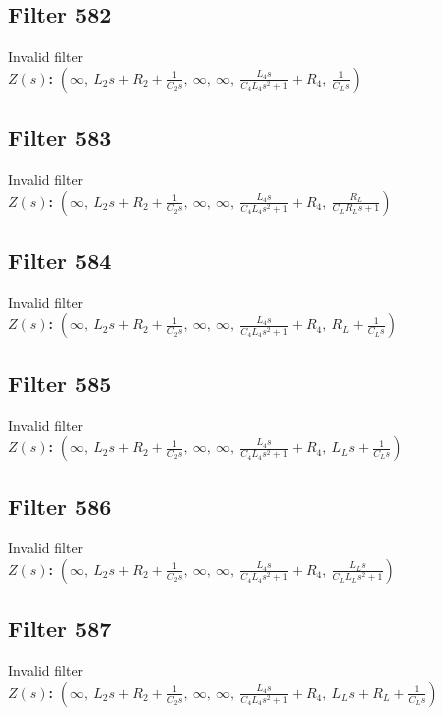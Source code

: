 \documentclass{article}
\begin{document}
\subsection*{Filter 582}
Invalid filter \\ 
\textbf{$Z(s)$:} $\left( \infty, \  L_{2} s + R_{2} + \frac{1}{C_{2} s}, \  \infty, \  \infty, \  \frac{L_{4} s}{C_{4} L_{4} s^{2} + 1} + R_{4}, \  \frac{1}{C_{L} s}\right)$ \\ 
\subsection*{Filter 583}
Invalid filter \\ 
\textbf{$Z(s)$:} $\left( \infty, \  L_{2} s + R_{2} + \frac{1}{C_{2} s}, \  \infty, \  \infty, \  \frac{L_{4} s}{C_{4} L_{4} s^{2} + 1} + R_{4}, \  \frac{R_{L}}{C_{L} R_{L} s + 1}\right)$ \\ 
\subsection*{Filter 584}
Invalid filter \\ 
\textbf{$Z(s)$:} $\left( \infty, \  L_{2} s + R_{2} + \frac{1}{C_{2} s}, \  \infty, \  \infty, \  \frac{L_{4} s}{C_{4} L_{4} s^{2} + 1} + R_{4}, \  R_{L} + \frac{1}{C_{L} s}\right)$ \\ 
\subsection*{Filter 585}
Invalid filter \\ 
\textbf{$Z(s)$:} $\left( \infty, \  L_{2} s + R_{2} + \frac{1}{C_{2} s}, \  \infty, \  \infty, \  \frac{L_{4} s}{C_{4} L_{4} s^{2} + 1} + R_{4}, \  L_{L} s + \frac{1}{C_{L} s}\right)$ \\ 
\subsection*{Filter 586}
Invalid filter \\ 
\textbf{$Z(s)$:} $\left( \infty, \  L_{2} s + R_{2} + \frac{1}{C_{2} s}, \  \infty, \  \infty, \  \frac{L_{4} s}{C_{4} L_{4} s^{2} + 1} + R_{4}, \  \frac{L_{L} s}{C_{L} L_{L} s^{2} + 1}\right)$ \\ 
\subsection*{Filter 587}
Invalid filter \\ 
\textbf{$Z(s)$:} $\left( \infty, \  L_{2} s + R_{2} + \frac{1}{C_{2} s}, \  \infty, \  \infty, \  \frac{L_{4} s}{C_{4} L_{4} s^{2} + 1} + R_{4}, \  L_{L} s + R_{L} + \frac{1}{C_{L} s}\right)$ \\ 
\end{document}

